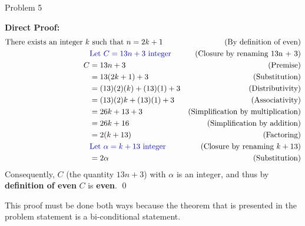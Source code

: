\begin{problem}{Problem 5}
\begin{highlight}[Solution]
        \textbf{Direct Proof:} \newline
        \begin{align*}
            \text{There exists an integer } k & \text{ such that } n = 2k + 1 & \text{(By definition of even)} \\
            & \textcolor{blue}{\text{Let } C = 13n + 3 \text{ integer}} & \text{(Closure by renaming 13n + 3)} \\
            C & = 13n + 3 & \text{(Premise)} \\
            & = 13(2k + 1) + 3 & \text{(Substitution)} \\
            & = (13)(2)(k) + (13)(1) + 3 & \text{(Distributivity)} \\
            & = (13)(2)k + (13)(1) + 3 & \text{(Associativity)} \\
            & = 26k + 13 + 3 & \text{(Simplification by multiplication)} \\
            & = 26k + 16 & \text{(Simplification by addition)} \\
            & = 2(k + 13) & \text{(Factoring)} \\
            & \textcolor{blue}{\text{Let } \alpha = k + 13 \text{ integer}} & \text{(Closure by renaming $k + 13$)} \\
            & = 2\alpha & \text{(Substitution)} \\
        \end{align*}
        Consequently, $C$ (the quantity $13n + 3$) with $\alpha$ is an integer, and thus by \textbf{definition of even} $C$ is \textbf{even}. \qed \vspace*{1em}

        This proof must be done both ways because the theorem that is presented in the problem statement is a bi-conditional statement.
    \end{highlight}
\end{problem}

